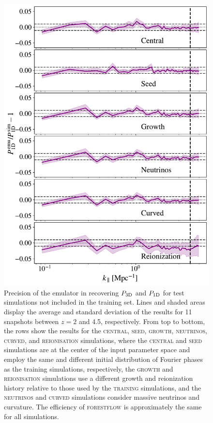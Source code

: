 \documentclass{aa}
\newcommand{\poned}{\ensuremath{P_{\rm 1D}}\xspace}
\newcommand{\pthreed}{\ensuremath{P_{\rm 3D}}\xspace}
\newcommand{\forestflow}{\textsc{forestflow}\xspace}
\newcommand{\lacehc}{\textsc{training}\xspace}
\newcommand{\simseed}{\textsc{seed}\xspace}
\newcommand{\simigm}{\textsc{reionisation}\xspace}
\newcommand{\simcurved}{\textsc{curved}\xspace}
\newcommand{\simh}{\textsc{growth}\xspace}
\newcommand{\simnu}{\textsc{neutrinos}\xspace}
\newcommand{\simcentral}{\textsc{central}\xspace}
\begin{document}
\begin{figure}
\includegraphics[width= 0.96\columnwidth]{figures/test_cosmo_P1D.pdf}
\centering
\caption{Precision of the emulator in recovering \pthreed and \poned for test simulations not included in the training set. Lines and shaded areas display the average and standard deviation of the results for 11 snapshots between $z=2$ and 4.5, respectively. From top to bottom, the rows show the results for the \simcentral, \simseed, \simh, \simnu, \simcurved, and \simigm simulations, where the \simcentral and \simseed simulations are at the center of the input parameter space and employ the same and different initial distribution of Fourier phases as the training simulations, respectively, the \simh and \simigm simulations use a different growth and reionization history relative to those used by the \lacehc simulations, and the \simnu and \simcurved simulations consider massive neutrinos and curvature. The efficiency of \forestflow is approximately the same for all simulations.}
\label{fig:other_cosmo}
\end{figure}
\end{document}
